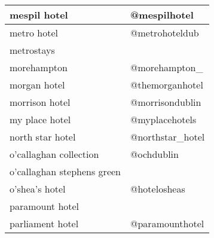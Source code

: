 \begin{table}[h!]
\begin{tabular}{|p{7cm}|p{5cm}|}
mespil hotel & @mespilhotel \\ \hline
metro hotel & @metrohoteldub \\ \hline
metrostays &  \\ \hline
morehampton & @morehampton\_ \\ \hline
morgan hotel & @themorganhotel \\ \hline
morrison hotel & @morrisondublin \\ \hline
my place hotel & @myplacehotels \\ \hline
north star hotel & @northstar\_hotel \\ \hline
o'callaghan collection & @ochdublin \\ \hline
o'callaghan stephens green &  \\ \hline
o'shea's hotel & @hotelosheas \\ \hline
paramount hotel &  \\ \hline
parliament hotel & @paramounthotel \\ \hline
\end{tabular}
\end{table}


